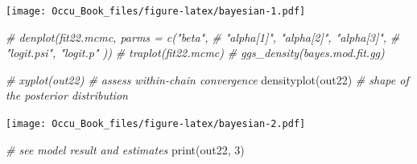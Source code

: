 \documentclass[
]{book}
\newenvironment{Shaded}{\begin{snugshade}}{\end{snugshade}}
\newcommand{\CommentTok}[1]{\textcolor[rgb]{0.56,0.35,0.01}{\textit{#1}}}
\newcommand{\DecValTok}[1]{\textcolor[rgb]{0.00,0.00,0.81}{#1}}
\newcommand{\FunctionTok}[1]{\textcolor[rgb]{0.00,0.00,0.00}{#1}}
\newcommand{\NormalTok}[1]{#1}
\begin{document}
\texttt{[image: Occu\_Book\_files/figure-latex/bayesian-1.pdf]}

\begin{Shaded}
\begin{Highlighting}[]
\CommentTok{\# denplot(fit22.mcmc, parms = c("beta", }
\CommentTok{\#                               "alpha[1]", "alpha[2]", "alpha[3]", }
\CommentTok{\#                               "logit.psi", "logit.p" ))}
\CommentTok{\# traplot(fit22.mcmc)}
\CommentTok{\# ggs\_density(bayes.mod.fit.gg)}

\CommentTok{\# xyplot(out22)        \# assess within{-}chain convergence}
\FunctionTok{densityplot}\NormalTok{(out22)  }\CommentTok{\# shape of the posterior distribution}
\end{Highlighting}
\end{Shaded}

\texttt{[image: Occu\_Book\_files/figure-latex/bayesian-2.pdf]}

\begin{Shaded}
\begin{Highlighting}[]
\CommentTok{\# see model result and estimates  }
\FunctionTok{print}\NormalTok{(out22, }\DecValTok{3}\NormalTok{)}
\end{Highlighting}
\end{Shaded}
\end{document}
